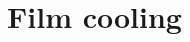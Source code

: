 \documentclass[a4paper, 11pt, oneside]{report}
\begin{document}



\chapter{Film cooling}
\label{chapter_leading_edge}


\end{document}
